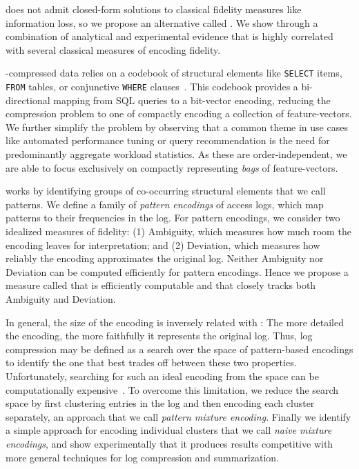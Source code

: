 \systemnameone does not admit closed-form solutions to classical fidelity measures like information loss, so we propose an alternative called \emph{\errorname}.
We show through a combination of analytical and experimental evidence that \errorname is highly correlated with several classical measures of encoding fidelity.

\systemnameone-compressed data relies on a codebook of structural elements like \texttt{SELECT} items, \texttt{FROM} tables, or conjunctive \texttt{WHERE} clauses~\cite{DBLP:journals/kais/AligonGMRT14}.
This codebook provides a bi-directional mapping from SQL queries to a bit-vector encoding, reducing the compression problem to one of compactly encoding a collection of feature-vectors.
We further simplify the problem by observing that a common theme in use cases like automated performance tuning or query recommendation is the need for predominantly aggregate workload statistics.
As these are order-independent, we are able to focus exclusively on compactly representing \emph{bags} of feature-vectors.

\systemnameone works by identifying groups of co-occurring structural elements that we call patterns.  
We define a family of \emph{pattern encodings} of access logs, which map patterns to their frequencies in the log.
For pattern encodings, we consider two idealized measures of fidelity: 
(1) Ambiguity, which measures how much room the encoding leaves for interpretation; and 
(2) Deviation, which measures how reliably the encoding approximates the original log.
Neither Ambiguity nor Deviation can be computed efficiently for pattern encodings.
Hence we propose a measure called \emph{\errorname} that is efficiently computable and that closely tracks both Ambiguity and Deviation.

In general, the size of the encoding is inversely related with \errorname: The more detailed the encoding, the more faithfully it represents the original log.
Thus, log compression may be defined as a search over the space of pattern-based encodings to identify the one that best trades off between these two properties.
Unfortunately, searching for such an ideal encoding from the space can be computationally expensive~\cite{DBLP:journals/tkdd/MampaeyVT12,DBLP:journals/pvldb/GebalyAGKS14}.
To overcome this limitation, we reduce the search space by first clustering entries in the log and then encoding each cluster separately, an approach that we call \textit{pattern mixture encoding}.
Finally we identify a simple approach for encoding individual clusters that we call \textit{naive mixture encodings}, and show experimentally that it produces results competitive with more general techniques for log compression and summarization.

